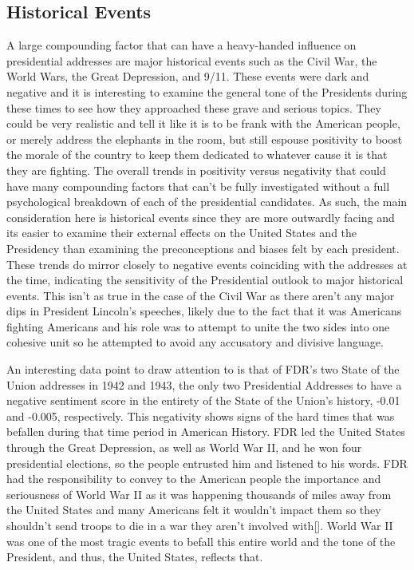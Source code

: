 \subsection{Historical Events}
A large compounding factor that can have a heavy-handed influence on presidential addresses are major historical events such as the Civil War, the World Wars, the Great Depression, and 9/11.
These events were dark and negative and it is interesting to examine the general tone of the Presidents during these times to see how they approached these grave and serious topics.
They could be very realistic and tell it like it is to be frank with the American people, or merely address the elephants in the room, but still espouse positivity to boost the morale of the country to keep them dedicated to whatever cause it is that they are fighting.
The overall trends in positivity versus negativity that could have many compounding factors that can't be fully investigated without a full psychological breakdown of each of the presidential candidates.
As such, the main consideration here is historical events since they are more outwardly facing and its easier to examine their external effects on the United States and the Presidency than examining the preconceptions and biases felt by each president.
These trends do mirror closely to negative events coinciding with the addresses at the time, indicating the sensitivity of the Presidential outlook to major historical events.
This isn't as true in the case of the Civil War as there aren't any major dips in President Lincoln's speeches, likely due to the fact that it was Americans fighting Americans and his role was to attempt to unite the two sides into one cohesive unit so he attempted to avoid any accusatory and divisive language.

An interesting data point to draw attention to is that of FDR's two State of the Union addresses in 1942 and 1943, the only two Presidential Addresses to have a negative sentiment score in the entirety of the State of the Union's history, -0.01 and -0.005, respectively.
This negativity shows signs of the hard times that was befallen during that time period in American History.
FDR led the United States through the Great Depression, as well as World War II, and he won four presidential elections, so the people entrusted him and listened to his words.
FDR had the responsibility to convey to the American people the importance and seriousness of World War II as it was happening thousands of miles away from the United States and many Americans felt it wouldn't impact them so they shouldn't send troops to die in a war they aren't involved with[\cite{roosevelt1964four}].
World War II was one of the most tragic events to befall this entire world and the tone of the President, and thus, the United States, reflects that.

